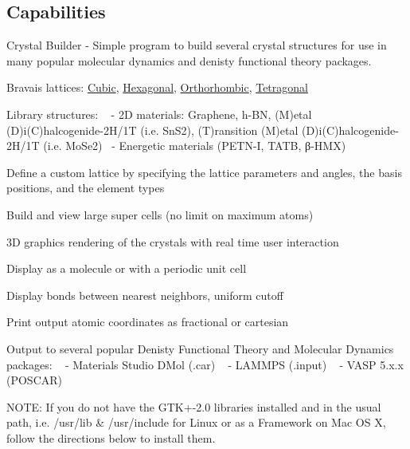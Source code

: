 \subsection*{Capabilities}

\begin{DoxyVerb}Crystal Builder - Simple program to build several crystal structures for use in many popular 
molecular dynamics and denisty functional theory packages.  
\end{DoxyVerb}



\begin{DoxyItemize}
\item Bravais lattices\+: \hyperlink{class_cubic}{Cubic}, \hyperlink{class_hexagonal}{Hexagonal}, \hyperlink{class_orthorhombic}{Orthorhombic}, \hyperlink{class_tetragonal}{Tetragonal}
\item Library structures\+: ~\newline
 -\/ 2\+D materials\+: Graphene, h-\/\+B\+N, (M)etal (D)i(\+C)halcogenide-\/2\+H/1\+T (i.\+e. Sn\+S2), (T)ransition (M)etal (D)i(\+C)halcogenide-\/2\+H/1\+T (i.\+e. Mo\+Se2)~\newline
 -\/ Energetic materials (P\+E\+T\+N-\/\+I, T\+A\+T\+B, β-\/\+H\+M\+X)
\item Define a custom lattice by specifying the lattice parameters and angles, the basis positions, and the element types
\item Build and view large super cells (no limit on maximum atoms)
\item 3\+D graphics rendering of the crystals with real time user interaction
\item Display as a molecule or with a periodic unit cell
\item Display bonds between nearest neighbors, uniform cutoff
\item Print output atomic coordinates as fractional or cartesian
\item Output to several popular Denisty Functional Theory and Molecular Dynamics packages\+: ~\newline
 -\/ Materials Studio D\+Mol (.car) ~\newline
 -\/ L\+A\+M\+M\+P\+S (.input) ~\newline
 -\/ V\+A\+S\+P 5.\+x.\+x (P\+O\+S\+C\+A\+R)
\end{DoxyItemize}

N\+O\+T\+E\+: If you do not have the G\+T\+K+-\/2.0 libraries installed and in the usual path, i.\+e. {\ttfamily /usr/lib \& /usr/include} for Linux or as a {\ttfamily Framework} on Mac O\+S X, follow the directions below to install them. 



